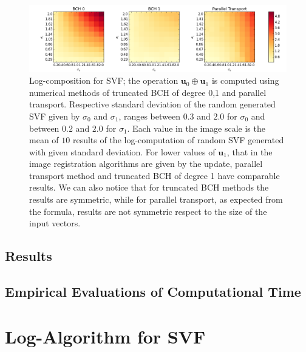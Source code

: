 \begin{figure}[!ht]
	\hspace{-2.1cm}
	\includegraphics[scale=0.53]{figures/SVF_image_scale.png}
	\caption{Log-composition for SVF; the operation $\mathbf{u}_0\oplus \mathbf{u}_1$ is computed using numerical methods of truncated BCH of degree 0,1 and parallel transport. Respective standard deviation of the random generated SVF given by $\sigma_0$ and $\sigma_1$, ranges between $0.3$ and $2.0$ for $\sigma_0$ and between $0.2$ and $2.0$ for $\sigma_1$. Each value in the image scale is the mean of $10$ results of the log-computation of random SVF generated with given standard deviation. For lower values of $\mathbf{u}_1$, that in the image registration algorithms are given by the update, parallel transport method and truncated BCH of degree 1 have comparable results. We can also notice that for truncated BCH methods the results are symmetric, while for parallel transport, as expected from the formula, results are not symmetric respect to the size of the input vectors. }
	\label{fig:SVF_image_scale}
\end{figure}


\subsection{Results}

\subsection{Empirical Evaluations of Computational Time}

\section{Log-Algorithm for SVF}

